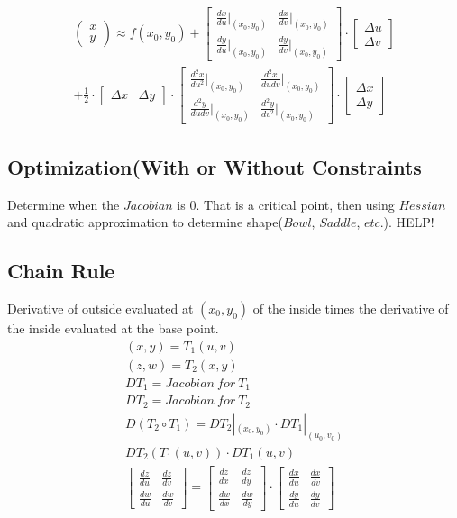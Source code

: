 \documentclass{article}
\begin{document}
\begin{multline*}
\left(\begin{matrix}
x \\ y
\end{matrix}\right) \approx f(x_0, y_0) + 
\left[\begin{matrix}
\frac{dx}{du}|_{(x_0,y_0)} & \frac{dx}{dv}|_{(x_0,y_0)} \\
\frac{dy}{du}|_{(x_0,y_0)} & \frac{dy}{dv}|_{(x_0,y_0)}
\end{matrix}\right] \cdot \left[\begin{matrix}
\Delta u \\ \Delta v
\end{matrix}\right]\\ + \frac{1}{2} \cdot
\left[\begin{matrix}
\Delta x & \Delta y
\end{matrix}\right] \cdot 
\left[\begin{matrix}
\frac{d^2x}{du^2}|_{(x_0,y_0)} & \frac{d^2x}{dudv}|_{(x_0,y_0)} \\
\frac{d^2y}{dudv}|_{(x_0,y_0)} & \frac{d^2y}{dv^2}|_{(x_0,y_0)}
\end{matrix}\right] \cdot
\left[\begin{matrix}
\Delta x \\ \Delta y
\end{matrix}\right]
\end{multline*}
\subsection{Optimization(With or Without Constraints}
Determine when the $Jacobian$ is $0$. That is a critical point, then using $Hessian$ and quadratic approximation to determine shape($Bowl$, $Saddle$, $etc.$).
HELP!
\subsection{Chain Rule}
Derivative of outside evaluated at $(x_0,y_0)$ of the inside times the derivative of the inside evaluated at the base point.
\begin{gather*}
(x,y)=T_1(u, v)\\
(z,w)=T_2(x, y)\\
DT_1 = Jacobian\ for\ T_1\\DT_2 = Jacobian\ for\ T_2\\
D(T_2 \circ T_1) = DT_2|_{(x_0,y_0)} \cdot DT_1|_{(u_0, v_0)}\\
DT_2(T_1(u,v))\cdot DT_1(u,v)\\
\left[\begin{matrix}
\frac{dz}{du} & \frac{dz}{dv} \\ \frac{dw}{du} & \frac{dw}{dv}
\end{matrix}\right] = \left[\begin{matrix}
\frac{dz}{dx} & \frac{dz}{dy} \\ \frac{dw}{dx} & \frac{dw}{dy}
\end{matrix}\right] \cdot \left[\begin{matrix}
\frac{dx}{du} & \frac{dx}{dv} \\ \frac{dy}{du} & \frac{dy}{dv}
\end{matrix}\right]
\end{gather*}
\end{document}
